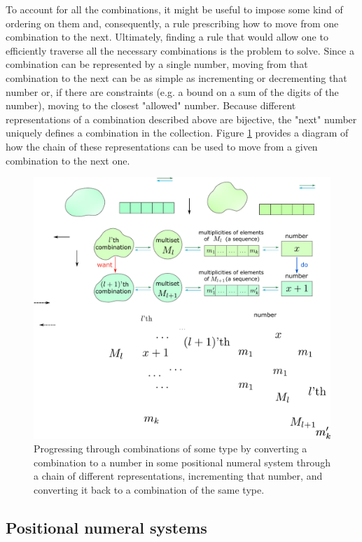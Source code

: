 \documentclass[12pt]{article}
\begin{document}
To account for all the combinations, it might be useful to impose some kind of ordering on them and, consequently, a rule prescribing how to move from one combination to the next. Ultimately, finding a rule that would allow one to efficiently traverse all the necessary combinations is the problem to solve. Since a combination can be represented by a single number, moving from that combination to the next can be as simple as incrementing or decrementing that number or, if there are constraints (e.g. a bound on a sum of the digits of the number), moving to the closest "allowed" number. Because different representations of a combination described above are bijective, the "next" number uniquely defines a combination in the collection. Figure \ref{fig:diag1} provides a diagram of how the chain of these representations can be used to move from a given combination to the next one. 

\begin{figure}
  \centering
  \includegraphics[scale = 0.81]{diagram1a.pdf}
  \caption{Progressing through combinations of some type by converting a combination to a number in some positional numeral system through a chain of different representations, incrementing that number, and converting it back to a combination of the same type.}
  \label{fig:diag1}
\end{figure}

\subsection*{Positional numeral systems}
\end{document}
